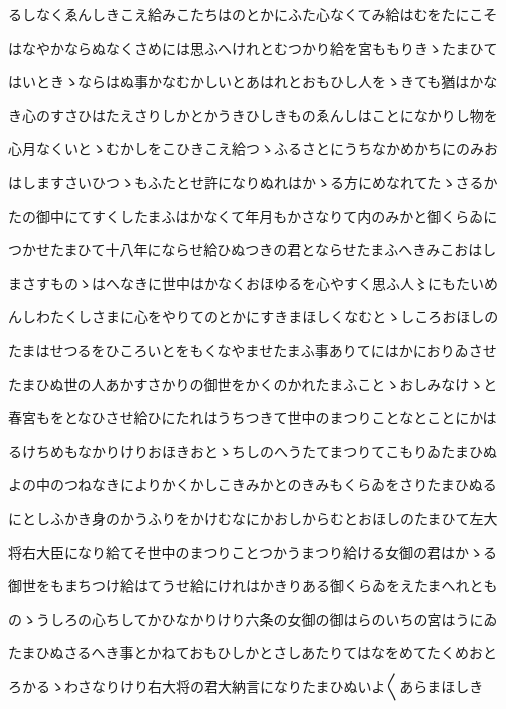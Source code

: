 \documentclass[a4paper,11pt,landscape]{ltjtarticle}
\begin{document}
\par\medskip
るしなくゑんしきこえ給みこたちはのとかにふた心なくてみ給はむをたにこそ
\par\medskip
はなやかならぬなくさめには思ふへけれとむつかり給を宮ももりきゝたまひて
\par\medskip
はいときゝならはぬ事かなむかしいとあはれとおもひし人をゝきても猶はかな
\par\medskip
き心のすさひはたえさりしかとかうきひしきものゑんしはことになかりし物を
\par\medskip
心月なくいとゝむかしをこひきこえ給つゝふるさとにうちなかめかちにのみお
\par\medskip
はしますさいひつゝもふたとせ許になりぬれはかゝる方にめなれてたゝさるか
\par\medskip
たの御中にてすくしたまふはかなくて年月もかさなりて内のみかと御くらゐに
\par\medskip
つかせたまひて十八年にならせ給ひぬつきの君とならせたまふへきみこおはし
\par\medskip
まさすものゝはへなきに世中はかなくおほゆるを心やすく思ふ人〻にもたいめ
\par\medskip
んしわたくしさまに心をやりてのとかにすきまほしくなむとゝしころおほしの
\par\medskip
たまはせつるをひころいとをもくなやませたまふ事ありてにはかにおりゐさせ
\par\medskip
たまひぬ世の人あかすさかりの御世をかくのかれたまふことゝおしみなけゝと
\par\medskip
春宮もをとなひさせ給ひにたれはうちつきて世中のまつりことなとことにかは
\par\medskip
るけちめもなかりけりおほきおとゝちしのへうたてまつりてこもりゐたまひぬ
\par\medskip
よの中のつねなきによりかくかしこきみかとのきみもくらゐをさりたまひぬる
\par\medskip
にとしふかき身のかうふりをかけむなにかおしからむとおほしのたまひて左大
\par\medskip
将右大臣になり給てそ世中のまつりことつかうまつり給ける女御の君はかゝる
\par\medskip
御世をもまちつけ給はてうせ給にけれはかきりある御くらゐをえたまへれとも
\par\medskip
のゝうしろの心ちしてかひなかりけり六条の女御の御はらのいちの宮はうにゐ
\par\medskip
たまひぬさるへき事とかねておもひしかとさしあたりてはなをめてたくめおと
\par\medskip
ろかるゝわさなりけり右大将の君大納言になりたまひぬいよ〱あらまほしき
\end{document}
